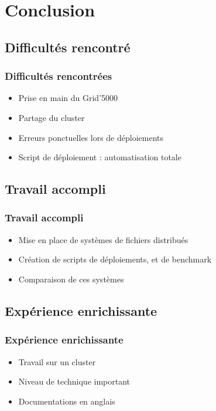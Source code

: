 \documentclass[blue]{beamer}
\begin{document}
\section{Conclusion}
	\subsection{Difficultés rencontré}
	\begin{frame}
	\frametitle{Difficultés rencontrées}
		\begin{itemize}
			\item Prise en main du Grid'5000
			\item Partage du cluster
			\item Erreurs ponctuelles lors de déploiements
			\item Script de déploiement : automatisation totale
		\end{itemize}
	\end{frame}

	\subsection{Travail accompli}
	\begin{frame}
	\frametitle{Travail accompli}
		\begin{itemize}
			\item Mise en place de systèmes de fichiers distribués
			\item Création de scripts de déploiements, et de benchmark
			\item Comparaison de ces systèmes
		\end{itemize}
	\end{frame}

	\subsection{Expérience enrichissante}
	\begin{frame}
	\frametitle{Expérience enrichissante}
		\begin{itemize}
			\item Travail sur un cluster
			\item Niveau de technique important
			\item Documentations en anglais
		\end{itemize}
	\end{frame}
\end{document}
